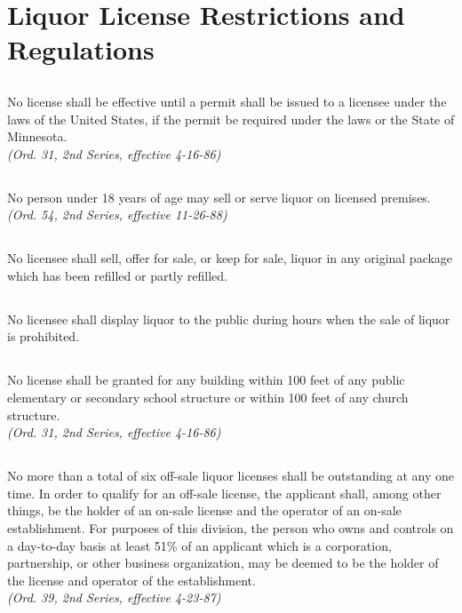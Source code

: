\section{Liquor License Restrictions and Regulations}
\subsection{}
No license shall be effective until a permit shall be issued to a licensee under the laws of the United States, if the permit be required under the laws or the State of Minnesota.\\
\emph{(Ord. 31, 2nd Series, effective 4-16-86)}
\subsection{}
No person under 18 years of age may sell or serve liquor on licensed premises.\\
\emph{(Ord. 54, 2nd Series, effective 11-26-88)}
\subsection{}
No licensee shall sell, offer for sale, or keep for sale, liquor in any original package which has been refilled or partly refilled.
\subsection{}
No licensee shall display liquor to the public during hours when the sale of liquor is prohibited.
\subsection{}
No license shall be granted for any building within 100 feet of any public elementary or secondary school structure or within 100 feet of any church structure.\\
\emph{(Ord. 31, 2nd Series, effective 4-16-86)}
\subsection{}
No more than a total of six off-sale liquor licenses shall be outstanding at any one time.  In order to qualify for an off-sale license, the applicant shall, among other things, be the holder of an on-sale license and the operator of an on-sale establishment.  For purposes of this division, the person who owns and controls on a day-to-day basis at least 51\% of an applicant which is a corporation, partnership, or other business organization, may be deemed to be the holder of the license and operator of the establishment.\\
\emph{(Ord. 39, 2nd Series, effective 4-23-87)}
